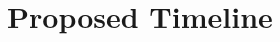 \documentclass[10pt,twocolumn]{article}
\begin{document}



\section {Proposed Timeline}
\end{document}
